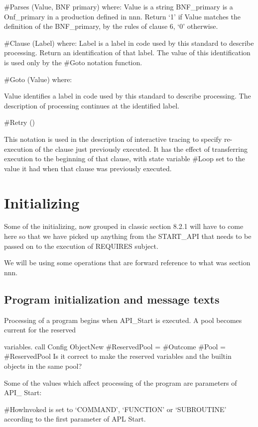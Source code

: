 \#Parses (Value, BNF primary) where: Value is a string BNF\_primary is a
Onf\_primary in a production defined in nnn. Return `1' if Value matches
the definition of the BNF\_primary, by the rules of clause 6, `0'
otherwise.

\#Clause (Label) where: Label is a label in code used by this standard
to describe processing. Return an identification of that label. The
value of this identification is used only by the \#Goto notation
function.

\#Goto (Value) where:

Value identifies a label in code used by this standard to describe
processing. The description of processing continues at the identified
label.

\#Retry ()

This notation is used in the description of interactive tracing to
specify re-execution of the clause just previously executed. It has the
effect of transferring execution to the beginning of that clause, with
state variable \#Loop set to the value it had when that clause was
previously executed.

\section{Initializing}\label{initializing}

Some of the initializing, now grouped in classic section 8.2.1 will have
to come here so that we have picked up anything from the START\_API that
needs to be passed on to the execution of REQUIRES subject.

We will be using some operations that are forward reference to what was
section nnn.

\subsection{Program initialization and message
texts}\label{program-initialization-and-message-texts}

Processing of a program begins when API\_Start is executed. A pool
becomes current for the reserved

variables. call Config ObjectNew \#ReservedPool = \#Outcome \#Pool =
\#ReservedPool Is it correct to make the reserved variables and the
builtin objects in the same pool?

Some of the values which affect processing of the program are parameters
of API\_ Start:

\#Howlnvoked is set to `COMMAND', `FUNCTION' or `SUBROUTINE' according
to the first parameter of APL Start.

